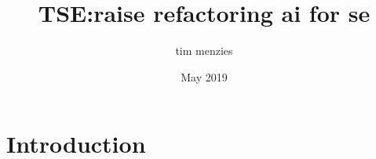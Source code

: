 \documentclass{article}
\title{TSE:raise refactoring ai for se}
\author{tim menzies}
\date{May 2019}
\begin{document}
\maketitle

\section{Introduction}
\end{document}
